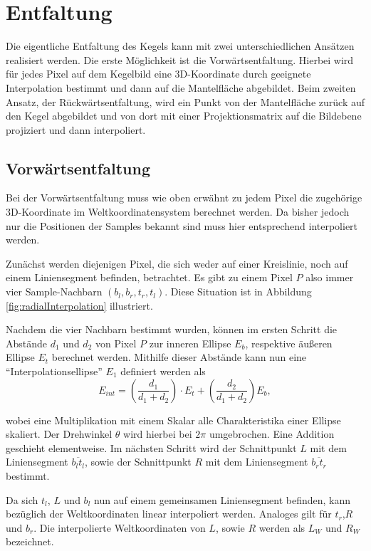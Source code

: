 \section{Entfaltung}
\label{s:unfolding}
Die eigentliche Entfaltung des Kegels kann mit zwei unterschiedlichen Ansätzen realisiert werden.
Die erste Möglichkeit ist die Vorwärtsentfaltung. Hierbei wird für jedes Pixel auf dem Kegelbild eine 3D-Koordinate durch geeignete Interpolation bestimmt und dann auf die Mantelfläche abgebildet. Beim zweiten Ansatz, der Rückwärtsentfaltung, wird ein Punkt von der Mantelfläche zurück auf den Kegel abgebildet und von dort mit einer Projektionsmatrix auf die Bildebene projiziert und dann interpoliert.

\subsection{Vorwärtsentfaltung}
Bei der Vorwärtsentfaltung muss wie oben erwähnt zu jedem Pixel die zugehörige 3D-Koordinate im Weltkoordinatensystem berechnet werden. Da bisher jedoch nur die Positionen der Samples bekannt sind muss hier entsprechend interpoliert werden.

Zunächst werden diejenigen Pixel, die sich weder auf einer Kreislinie, noch auf einem Liniensegment befinden, betrachtet. Es gibt zu einem Pixel $P$ also immer vier Sample-Nachbarn $(b_l, b_r, t_r, t_l)$. Diese Situation ist in Abbildung \ref{fig:radialInterpolation} illustriert.

Nachdem die vier Nachbarn bestimmt wurden, können im ersten Schritt die Abstände $d_1$ und $d_2$ von Pixel $P$ zur inneren Ellipse $E_b$, respektive äußeren Ellipse $E_t$ berechnet werden. Mithilfe dieser Abstände kann nun eine "`Interpolationsellipse"' $E_1$ definiert werden als
\begin{equation*}
	E_{int} = \left(\frac{d_1}{d_1 + d_2}\right) \cdot E_t + \left(\frac{d_2}{d_1 + d_2}\right) E_b,
\end{equation*}

wobei eine Multiplikation mit einem Skalar alle Charakteristika einer Ellipse skaliert. Der Drehwinkel $\theta$ wird hierbei bei $2\pi$ umgebrochen. Eine Addition geschieht elementweise. Im nächsten Schritt wird der Schnittpunkt $L$ mit dem Liniensegment $\overline{b_lt_l}$, sowie der Schnittpunkt $R$ mit dem Liniensegment $\overline{b_rt_r}$ bestimmt.

Da sich $t_l$, $L$ und $b_l$ nun auf einem gemeinsamen Liniensegment befinden, kann bezüglich der Weltkoordinaten linear interpoliert werden. Analoges gilt für $t_r$,$R$ und $b_r$.
Die interpolierte Weltkoordinaten von $L$, sowie $R$ werden als $L_W$ und $R_W$ bezeichnet.


